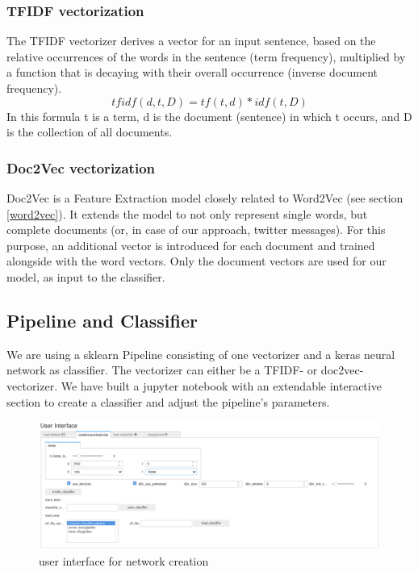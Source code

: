 \documentclass{article}
\begin{document}
\subsubsection{TFIDF vectorization}
The TFIDF vectorizer derives a vector for an input sentence, based on the relative occurrences of the words in the sentence (term frequency), multiplied by a function that is decaying with their overall occurrence (inverse document frequency).
\[tfidf(d,t,D) = tf(t,d) * idf(t,D)\]
In this formula t is a term, d is the document (sentence) in which t occurs, and D is the collection of all documents.

\subsubsection{Doc2Vec vectorization}
Doc2Vec is a Feature Extraction model closely related to Word2Vec (see section \ref{word2vec}). It extends the model to not only represent single words, but complete documents (or, in case of our approach, twitter messages). For this purpose, an additional vector is introduced for each document and trained alongside with the word vectors. Only the document vectors are used for our model, as input to the classifier.

\subsection{Pipeline and Classifier}
We are using a sklearn Pipeline consisting of one vectorizer and a keras neural network as classifier. The vectorizer can either be a TFIDF- or doc2vec-vectorizer. We have built a jupyter notebook with an extendable interactive section to create a classifier and adjust the pipeline’s parameters.

\begin{figure}[h!]
\centering
\includegraphics[width=\textwidth,height=\textheight,keepaspectratio]{images/Network-UI.png}
\caption{user interface for network creation}
\label{fig:NetworkUI}
\end{figure}
\end{document}

